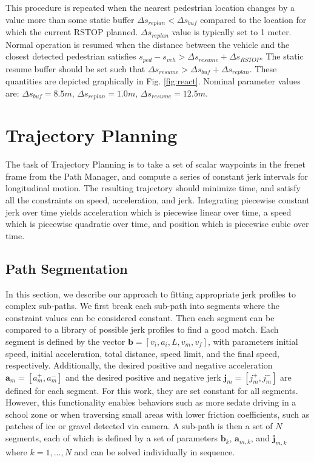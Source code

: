 \documentclass[letterpaper, 10 pt, conference]{ieeeconf}  %
\begin{document}
This procedure is repeated when the nearest pedestrian location changes by a value more than some static buffer $\Delta s_{replan} < \Delta s_{buf}$ compared to the location for which the current RSTOP planned.
$\Delta s_{replan}$ value is typically set to 1 meter.
Normal operation is resumed when the distance between the vehicle and the closest detected pedestrian satisfies $s_{ped} - s_{veh} > \Delta s_{resume} + \Delta s_{RSTOP}$. The static resume buffer should be set such that $\Delta s_{resume} > \Delta s_{buf} + \Delta s_{replan}$.
These quantities are depicted graphically in Fig. \ref{fig:react}.
Nominal parameter values are: $\Delta s_{buf} = 8.5 m$, $\Delta s_{replan} = 1.0 m$, $\Delta s_{resume} = 12.5 m$.

\section{Trajectory Planning} \label{sec:trajectoryplanning}

The task of Trajectory Planning is to take a set of scalar waypoints in the frenet frame from the Path Manager, and compute a series of constant jerk intervals for longitudinal motion.%
The resulting trajectory should minimize time, and satisfy all the constraints on speed, acceleration, and jerk.
Integrating piecewise constant jerk over time yields acceleration which is piecewise linear over time, a speed which is piecewise quadratic over time, and position which is piecewise cubic over time.


\subsection{Path Segmentation} \label{sec:pathsegmentation}

In this section, we describe our approach to fitting appropriate jerk profiles to complex sub-paths. 
We first break each sub-path into segments where the constraint values can be considered constant.
Then each segment can be compared to a library of possible jerk profiles to find a good match.
Each segment is defined by the vector $\mathbf{b}  = [v_i, a_i, L, v_m, v_f]$, with parameters initial speed, initial acceleration, total distance, speed limit, and the final speed, respectively.
Additionally, the desired positive and negative acceleration $\mathbf{a}_m = [a^+_m , a^-_m]$ and the desired positive and negative jerk $\mathbf{j}_m = [j^+_m , j^-_m]$ are defined for each segment.
For this work, they are set constant for all segments.
However, this functionality enables behaviors such as more sedate driving in a school zone or when traversing small areas with lower friction coefficients, such as patches of ice or gravel detected via camera.
A sub-path is then a set of $N$ segments, each of which is defined by a set of parameters $\mathbf{b}_{k}$, $\mathbf{a}_{m,k}$, and $\mathbf{j}_{m,k}$ where $k = 1, ..., N$ and can be solved individually in sequence.
\end{document}
